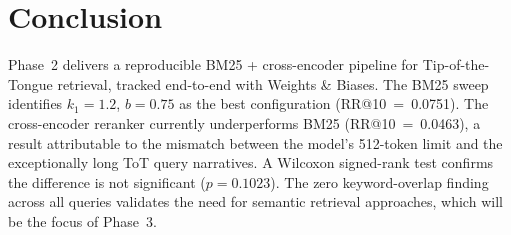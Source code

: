 \documentclass[conference]{IEEEtran}
\begin{document}
\section{Conclusion}

Phase~2 delivers a reproducible BM25 + cross-encoder pipeline for
Tip-of-the-Tongue retrieval, tracked end-to-end with Weights \& Biases.
The BM25 sweep identifies $k_1=1.2$, $b=0.75$ as the best configuration
(RR@10~=~0.0751).
The cross-encoder reranker currently underperforms BM25 (RR@10~=~0.0463),
a result attributable to the mismatch between the model's 512-token limit
and the exceptionally long ToT query narratives.
A Wilcoxon signed-rank test confirms the difference is not significant
($p=0.1023$).
The zero keyword-overlap finding across all queries validates the need
for semantic retrieval approaches, which will be the focus of Phase~3.
\end{document}
